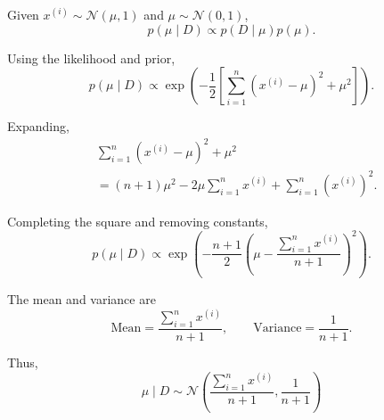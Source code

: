 \documentclass[11pt]{article}
\begin{document}
Given $x^{(i)}\sim\mathcal N(\mu,1)$
and $\mu\sim\mathcal N(0,1)$,
\[
p(\mu\mid D)\propto p(D\mid\mu)p(\mu).
\]

Using the likelihood and prior,
\[
p(\mu\mid D)\propto
\exp\left(
-\frac12\left[
\sum_{i=1}^{n}(x^{(i)}-\mu)^2+\mu^2
\right]\right).
\]

Expanding,
\[
\begin{aligned}
&\sum_{i=1}^{n}(x^{(i)}-\mu)^2+\mu^2\\
&=(n+1)\mu^2-2\mu\sum_{i=1}^{n}x^{(i)}
+\sum_{i=1}^{n}(x^{(i)})^2.
\end{aligned}
\]

Completing the square and removing constants,
\[
p(\mu\mid D)\propto
\exp\left(
-\frac{n+1}{2}
\left(
\mu-\frac{\sum_{i=1}^{n}x^{(i)}}{n+1}
\right)^2
\right).
\]

The mean and variance are
\[
\text{Mean}=\frac{\sum_{i=1}^{n}x^{(i)}}{n+1},
\qquad
\text{Variance}=\frac{1}{n+1}.
\]

Thus,
\[
\boxed{
\mu\mid D\sim
\mathcal N\left(
\frac{\sum_{i=1}^{n}x^{(i)}}{n+1},
\frac{1}{n+1}
\right)
}
\]
\end{document}

